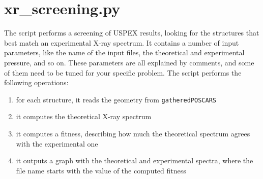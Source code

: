 \documentclass{article}
\begin{document}
\section{xr\_screening.py}
The script performs a screening of USPEX results, looking for the structures that best match an experimental X-ray spectrum. It contains a number of input parameters, like the name of the input files, the theoretical and experimental pressure, and so on. These parameters are all explained by comments, and some of them need to be tuned for your specific problem. The script performs the following operations:
\begin{enumerate}
	\item for each structure, it reads the geometry from \texttt{gatheredPOSCARS}
	\item it computes the theoretical X-ray spectrum
	\item it computes a fitness, describing how much the theoretical spectrum agrees with the experimental one
	\item it outputs a graph with the theoretical and experimental spectra, where the file name starts with the value of the computed fitness
\end{enumerate}
\end{document}
